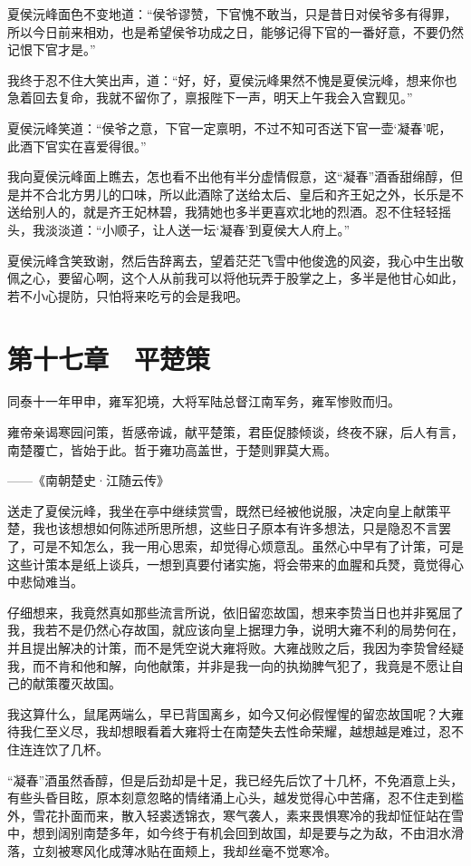 夏侯沅峰面色不变地道：“侯爷谬赞，下官愧不敢当，只是昔日对侯爷多有得罪，所以今日前来相劝，也是希望侯爷功成之日，能够记得下官的一番好意，不要仍然记恨下官才是。”

我终于忍不住大笑出声，道：“好，好，夏侯沅峰果然不愧是夏侯沅峰，想来你也急着回去复命，我就不留你了，禀报陛下一声，明天上午我会入宫觐见。”

夏侯沅峰笑道：“侯爷之意，下官一定禀明，不过不知可否送下官一壶‘凝春’呢，此酒下官实在喜爱得很。”

我向夏侯沅峰面上瞧去，怎也看不出他有半分虚情假意，这“凝春”酒香甜绵醇，但是并不合北方男儿的口味，所以此酒除了送给太后、皇后和齐王妃之外，长乐是不送给别人的，就是齐王妃林碧，我猜她也多半更喜欢北地的烈酒。忍不住轻轻摇头，我淡淡道：“小顺子，让人送一坛‘凝春’到夏侯大人府上。”

夏侯沅峰含笑致谢，然后告辞离去，望着茫茫飞雪中他俊逸的风姿，我心中生出敬佩之心，要留心啊，这个人从前我可以将他玩弄于股掌之上，多半是他甘心如此，若不小心提防，只怕将来吃亏的会是我吧。

\chapter{第十七章　平楚策}

同泰十一年甲申，雍军犯境，大将军陆总督江南军务，雍军惨败而归。

雍帝亲谒寒园问策，哲感帝诚，献平楚策，君臣促膝倾谈，终夜不寐，后人有言，南楚覆亡，皆始于此。哲于雍功高盖世，于楚则罪莫大焉。

——《南朝楚史·江随云传》

送走了夏侯沅峰，我坐在亭中继续赏雪，既然已经被他说服，决定向皇上献策平楚，我也该想想如何陈述所思所想，这些日子原本有许多想法，只是隐忍不言罢了，可是不知怎么，我一用心思索，却觉得心烦意乱。虽然心中早有了计策，可是这些计策本是纸上谈兵，一想到真要付诸实施，将会带来的血腥和兵燹，竟觉得心中悲恸难当。

仔细想来，我竟然真如那些流言所说，依旧留恋故国，想来李贽当日也并非冤屈了我，我若不是仍然心存故国，就应该向皇上据理力争，说明大雍不利的局势何在，并且提出解决的计策，而不是凭空说大雍将败。大雍战败之后，我因为李贽曾经疑我，而不肯和他和解，向他献策，并非是我一向的执拗脾气犯了，我竟是不愿让自己的献策覆灭故国。

我这算什么，鼠尾两端么，早已背国离乡，如今又何必假惺惺的留恋故国呢？大雍待我仁至义尽，我却想眼看着大雍将士在南楚失去性命荣耀，越想越是难过，忍不住连连饮了几杯。

“凝春”酒虽然香醇，但是后劲却是十足，我已经先后饮了十几杯，不免酒意上头，有些头昏目眩，原本刻意忽略的情绪涌上心头，越发觉得心中苦痛，忍不住走到槛外，雪花扑面而来，散入轻裘透锦衣，寒气袭人，素来畏惧寒冷的我却怔怔站在雪中，想到阔别南楚多年，如今终于有机会回到故国，却是要与之为敌，不由泪水滑落，立刻被寒风化成薄冰贴在面颊上，我却丝毫不觉寒冷。

